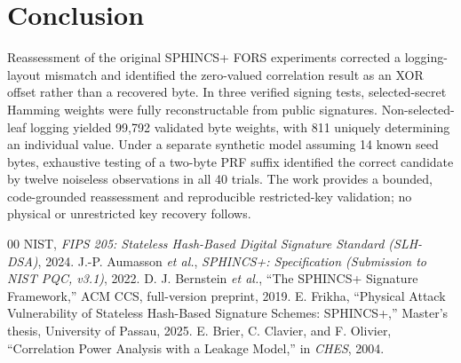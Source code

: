 \documentclass[conference,a4paper,10pt]{IEEEtran}
\begin{document}
\section{Conclusion}
Reassessment of the original SPHINCS+ FORS experiments corrected a logging-layout mismatch and identified the zero-valued correlation result as an XOR offset rather than a recovered byte. In three verified signing tests, selected-secret Hamming weights were fully reconstructable from public signatures. Non-selected-leaf logging yielded 99,792 validated byte weights, with 811 uniquely determining an individual value. Under a separate synthetic model assuming 14 known seed bytes, exhaustive testing of a two-byte PRF suffix identified the correct candidate by twelve noiseless observations in all 40 trials. The work provides a bounded, code-grounded reassessment and reproducible restricted-key validation; no physical or unrestricted key recovery follows.

\begin{thebibliography}{00}
 NIST, \emph{FIPS 205: Stateless Hash-Based Digital Signature Standard (SLH-DSA)}, 2024.
 J.-P. Aumasson \emph{et al.}, \emph{SPHINCS+: Specification (Submission to NIST PQC, v3.1)}, 2022.
 D. J. Bernstein \emph{et al.}, ``The SPHINCS+ Signature Framework,'' ACM CCS, full-version preprint, 2019.
 E. Frikha, ``Physical Attack Vulnerability of Stateless Hash-Based Signature Schemes: SPHINCS+,'' Master's thesis, University of Passau, 2025.
 E. Brier, C. Clavier, and F. Olivier, ``Correlation Power Analysis with a Leakage Model,'' in \emph{CHES}, 2004.
\end{thebibliography}
\end{document}

